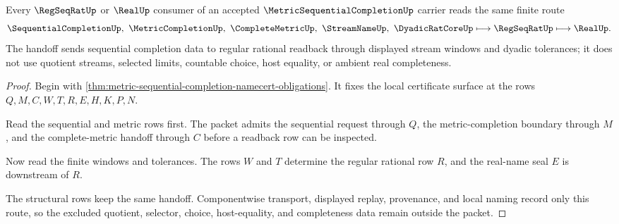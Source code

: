 \begin{theorem}
\label{thm:metric-sequential-completion-regseqrat-handoff}
Every $\RegSeqRatUp$ or $\RealUp$ consumer of an accepted $\MetricSequentialCompletionUp$ carrier reads the same finite route
$$
\SequentialCompletionUp,\ \MetricCompletionUp,\ \CompleteMetricUp,\ \StreamNameUp,\ \DyadicRatCoreUp
\longmapsto
\RegSeqRatUp
\longmapsto
\RealUp .
$$
The handoff sends sequential completion data to regular rational readback through displayed stream windows and dyadic tolerances; it does not use quotient streams, selected limits, countable choice, host equality, or ambient real completeness.
\end{theorem}
\begin{proof}
Begin with \autoref{thm:metric-sequential-completion-namecert-obligations}. It fixes the local certificate surface at the rows $Q,M,C,W,T,R,E,H,K,P,N$.

Read the sequential and metric rows first. The packet admits the sequential request through $Q$, the metric-completion boundary through $M$, and the complete-metric handoff through $C$ before a readback row can be inspected.

Now read the finite windows and tolerances. The rows $W$ and $T$ determine the regular rational row $R$, and the real-name seal $E$ is downstream of $R$.

The structural rows keep the same handoff. Componentwise transport, displayed replay, provenance, and local naming record only this route, so the excluded quotient, selector, choice, host-equality, and completeness data remain outside the packet.
\end{proof}


